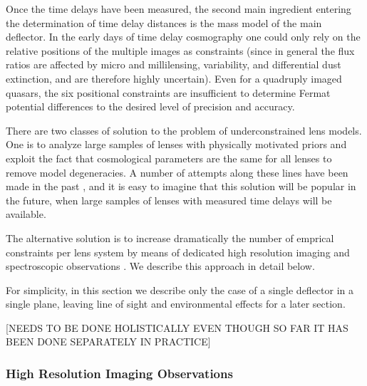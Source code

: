 Once the time delays have been measured, the second main ingredient
entering the determination of time delay distances is the mass model
of the main deflector. In the early days of time delay cosmography one
could only rely on the relative positions of the multiple images as
constraints (since in general the flux ratios are affected by micro
and millilensing, variability, and differential dust extinction, and
are therefore highly uncertain). Even for a quadruply imaged quasars,
the six positional constraints are insufficient to determine Fermat
potential differences to the desired level of precision and accuracy.

There are two classes of solution to the problem of underconstrained
lens models. One is to analyze large samples of lenses with physically
motivated priors and exploit the fact that cosmological parameters are
the same for all lenses to remove model degeneracies. A number of
attempts along these lines have been made in the past \citep{Ogu07},
and it is easy to imagine that this solution will be popular in the
future, when large samples of lenses with measured time delays will be
available.

The alternative solution is to increase dramatically the number of
emprical constraints per lens system by means of dedicated high
resolution imaging and spectroscopic observations
\citep{Suy++10,Suy++13,Suy++14}. We describe this approach in detail
below.

For simplicity, in this section we describe only the case of a single
deflector in a single plane, leaving line of sight and environmental
effects for a later section.

[NEEDS TO BE DONE HOLISTICALLY EVEN THOUGH SO FAR IT HAS BEEN DONE
SEPARATELY IN PRACTICE]


\subsubsection{High Resolution Imaging Observations}

